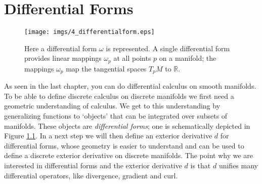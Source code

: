 \chapter{Differential Forms}
\label{chap:diffforms}

\begin{figure}[h]%
\begin{center}
\texttt{[image: imgs/4\_differentialform.eps]}%
\end{center}

\caption{Here a differential form $\omega$ is represented. A single differential form provides linear mappings $\omega_p$ at all points $p$ on a manifold; the mappings $\omega_p$ map the tangential spaces $T_pM$ to $\mathbb R$.}%
\label{fig:4_differentialform}%
\end{figure}
As seen in the last chapter, you can do differential calculus on smooth manifolds. To be able to define discrete calculus on discrete manifolds we first need a geometric understanding of calculus. We get to this understanding by generalizing functions to `objects' that can be integrated over subsets of manifolds. These objects are \emph{differential forms}; one is schematically depicted in Figure \ref{fig:4_differentialform}. In a next step we will then define an exterior derivative $d$ for differential forms, whose geometry is easier to understand and can be used to define a discrete exterior derivative on discrete manifolds.
 The point why we are interested in differential forms and the exterior derivative $d$ is that $d$ unifies many differential operators, like divergence, gradient and curl.


